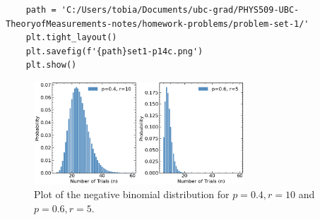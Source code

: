 \documentclass[10pt]{article}
\begin{document}
\begin{enumerate}[label=(\alph*)]
\begin{verbatim}
	path = 'C:/Users/tobia/Documents/ubc-grad/PHYS509-UBC-TheoryofMeasurements-notes/homework-problems/problem-set-1/'
	plt.tight_layout()
	plt.savefig(f'{path}set1-p14c.png')
	plt.show()

	\end{verbatim}

	      \begin{figure}[h]
		      \centering
		      \includegraphics[width=0.7\textwidth]{set1-p14c.png}
		      \caption{Plot of the negative binomial distribution for $p=0.4, r=10$ and $p=0.6, r=5$.}
		      \label{fig:negative-binomial}
	      \end{figure}
\end{enumerate}


\printbibliography
\end{document}
